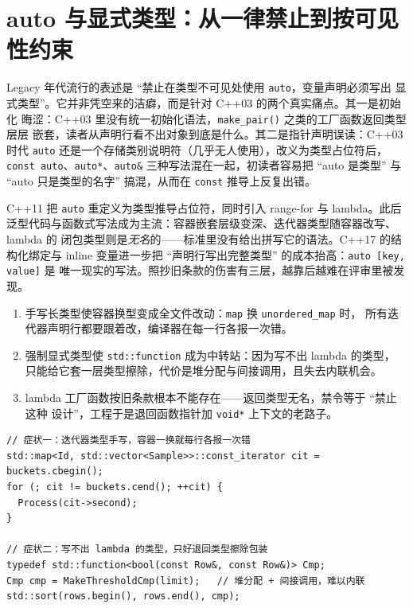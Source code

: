 \documentclass[12pt,a4paper,fontset=fandol]{ctexbook}
\newcommand{\cpp}[1]{C++#1}
\newcommand{\Fn}[1]{\texttt{#1()}}
\newcommand{\Tp}[1]{\texttt{#1}}
\newcommand{\Bk}{\discretionary{}{}{}}
\newcommand{\Lang}[1]{\textsf{#1}}
\newcommand{\DomTra}{\Lang{Legacy}}
\begin{document}
\section{auto 与显式类型：从一律禁止到按可见性约束}
\label{sec:ch12-auto}

\DomTra{} 年代流行的表述是 ``禁止在类型不可见处使用 \Tp{auto}，变量声明必须写出
显式类型''。它并非凭空来的洁癖，而是针对 \cpp{03} 的两个真实痛点。其一是初始化
晦涩：\cpp{03} 里没有统一初始化语法，\Fn{make\_pair} 之类的工厂函数返回类型层层
嵌套，读者从声明行看不出对象到底是什么。其二是指针声明误读：\cpp{03} 时代
\Tp{auto} 还是一个存储类别说明符（几乎无人使用），改义为类型占位符后，
\Tp{const auto}、\Tp{auto*}、\Tp{auto\&} 三种写法混在一起，初读者容易把
``auto 是类型'' 与 ``auto 只是类型的名字'' 搞混，从而在 \Tp{const} 推导上反复出错。

\cpp{11} 把 \Tp{auto} 重定义为类型推导占位符，同时引入 range-for 与 lambda。此后
泛型代码与函数式写法成为主流：容器嵌套层级变深、迭代器类型随容器改写、lambda 的
闭包类型则是\emph{无名}的——标准里没有给出拼写它的语法。\cpp{17} 的结构化绑定与
inline 变量进一步把 ``声明行写出完整类型'' 的成本抬高：\Tp{auto [key, value]} 是
唯一现实的写法。照抄旧条款的伤害有三层，越靠后越难在评审里被发现。
\begin{enumerate}[label=（\arabic*）]
\item 手写长类型使容器换型变成全文件改动：\Tp{map} 换 \Tp{unordered\_map} 时，
  所有迭代器声明行都要跟着改，编译器在每一行各报一次错。
\item 强制显式类型使 \Tp{std::{\Bk}function} 成为中转站：因为写不出 lambda 的类型，
  只能给它套一层类型擦除，代价是堆分配与间接调用，且失去内联机会。
\item lambda 工厂函数按旧条款根本不能存在——返回类型无名，禁令等于 ``禁止这种
  设计''，工程于是退回函数指针加 \Tp{void*} 上下文的老路子。
\end{enumerate}

\begin{lstlisting}[style=cppstyle,caption={限制 \Tp{auto} 后被迫写出的代码},label={lst:ch12-auto-legacy}]
// 症状一：迭代器类型手写，容器一换就每行各报一次错
std::map<Id, std::vector<Sample>>::const_iterator cit = buckets.cbegin();
for (; cit != buckets.cend(); ++cit) {
  Process(cit->second);
}

// 症状二：写不出 lambda 的类型，只好退回类型擦除包装
typedef std::function<bool(const Row&, const Row&)> Cmp;
Cmp cmp = MakeThresholdCmp(limit);   // 堆分配 + 间接调用，难以内联
std::sort(rows.begin(), rows.end(), cmp);
\end{lstlisting}
\end{document}
